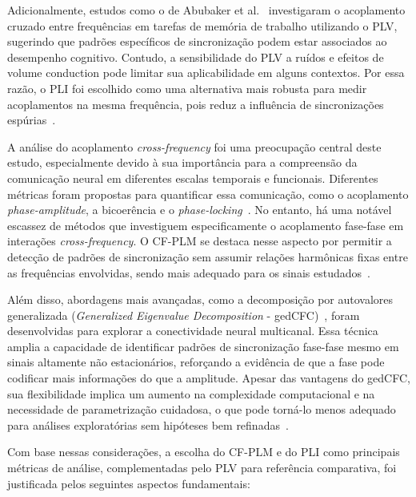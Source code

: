 Adicionalmente, estudos como o de Abubaker et al.~\cite{abubaker2021working} investigaram o acoplamento cruzado entre frequências em tarefas de memória de trabalho utilizando o PLV, sugerindo que padrões específicos de sincronização podem estar associados ao desempenho cognitivo. Contudo, a sensibilidade do PLV a ruídos e efeitos de volume conduction pode limitar sua aplicabilidade em alguns contextos. Por essa razão, o PLI foi escolhido como uma alternativa mais robusta para medir acoplamentos na mesma frequência, pois reduz a influência de sincronizações espúrias~\cite{seraj2018cerebral, zhang2014phase}.

A análise do acoplamento \textit{cross-frequency} foi uma preocupação central deste estudo, especialmente devido à sua importância para a compreensão da comunicação neural em diferentes escalas temporais e funcionais. Diferentes métricas foram propostas para quantificar essa comunicação, como o acoplamento \textit{phase-amplitude}, a bicoerência e o \textit{phase-locking}~\cite{hulsemann2019quantification}. No entanto, há uma notável escassez de métodos que investiguem especificamente o acoplamento fase-fase em interações \textit{cross-frequency}. O CF-PLM se destaca nesse aspecto por permitir a detecção de padrões de sincronização sem assumir relações harmônicas fixas entre as frequências envolvidas, sendo mais adequado para os sinais estudados~\cite{sorrentino2022detection, seraj2018cerebral, chen2023multiple}.

Além disso, abordagens mais avançadas, como a decomposição por autovalores generalizada (\textit{Generalized Eigenvalue Decomposition} - gedCFC)~\cite{cohen2017where}, foram desenvolvidas para explorar a conectividade neural multicanal. Essa técnica amplia a capacidade de identificar padrões de sincronização fase-fase mesmo em sinais altamente não estacionários, reforçando a evidência de que a fase pode codificar mais informações do que a amplitude. Apesar das vantagens do gedCFC, sua flexibilidade implica um aumento na complexidade computacional e na necessidade de parametrização cuidadosa, o que pode torná-lo menos adequado para análises exploratórias sem hipóteses bem refinadas~\cite{cohen2017multivariate}.

Com base nessas considerações, a escolha do CF-PLM e do PLI como principais métricas de análise, complementadas pelo PLV para referência comparativa, foi justificada pelos seguintes aspectos fundamentais:

